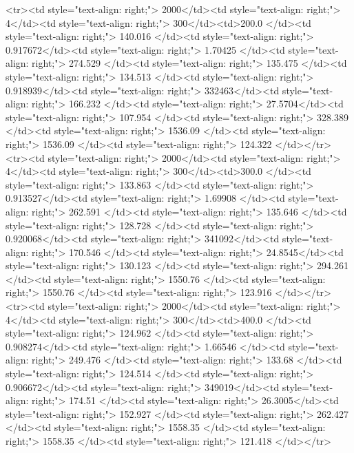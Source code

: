 <tr><td style="text-align: right;">      2000</td><td style="text-align: right;">         4</td><td style="text-align: right;">           300</td><td>200.0        </td><td style="text-align: right;">               140.016 </td><td style="text-align: right;">           0.917672</td><td style="text-align: right;">         1.70425 </td><td style="text-align: right;">        274.529 </td><td style="text-align: right;">           135.475 </td><td style="text-align: right;">             134.513   </td><td style="text-align: right;">             0.918939</td><td style="text-align: right;">              332463</td><td style="text-align: right;">                      166.232 </td><td style="text-align: right;">            27.5704</td><td style="text-align: right;">               107.954  </td><td style="text-align: right;">       328.389 </td><td style="text-align: right;">   1536.09 </td><td style="text-align: right;">      1536.09 </td><td style="text-align: right;">                124.322 </td></tr>
<tr><td style="text-align: right;">      2000</td><td style="text-align: right;">         4</td><td style="text-align: right;">           300</td><td>300.0        </td><td style="text-align: right;">               133.863 </td><td style="text-align: right;">           0.913527</td><td style="text-align: right;">         1.69908 </td><td style="text-align: right;">        262.591 </td><td style="text-align: right;">           135.646 </td><td style="text-align: right;">             128.728   </td><td style="text-align: right;">             0.920068</td><td style="text-align: right;">              341092</td><td style="text-align: right;">                      170.546 </td><td style="text-align: right;">            24.8545</td><td style="text-align: right;">               130.123  </td><td style="text-align: right;">       294.261 </td><td style="text-align: right;">   1550.76 </td><td style="text-align: right;">      1550.76 </td><td style="text-align: right;">                123.916 </td></tr>
<tr><td style="text-align: right;">      2000</td><td style="text-align: right;">         4</td><td style="text-align: right;">           300</td><td>400.0        </td><td style="text-align: right;">               124.962 </td><td style="text-align: right;">           0.908274</td><td style="text-align: right;">         1.66546 </td><td style="text-align: right;">        249.476 </td><td style="text-align: right;">           133.68  </td><td style="text-align: right;">             124.514   </td><td style="text-align: right;">             0.906672</td><td style="text-align: right;">              349019</td><td style="text-align: right;">                      174.51  </td><td style="text-align: right;">            26.3005</td><td style="text-align: right;">               152.927  </td><td style="text-align: right;">       262.427 </td><td style="text-align: right;">   1558.35 </td><td style="text-align: right;">      1558.35 </td><td style="text-align: right;">                121.418 </td></tr>
